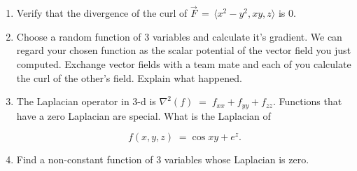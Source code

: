 \documentclass{amsart}
\begin{document}
\begin{enumerate}
\vfill

\newpage 

\item Verify that the divergence of the curl of $\vec{F} \, = \, \langle x^2-y^2, xy, z  \rangle$ is 0.

\vfill

\item Choose a random function of 3 variables and calculate it's gradient.  We can regard your chosen function as the scalar potential of the vector field you just computed.  Exchange vector fields with a team mate and each of you calculate the curl of the other's field.   Explain what happened.

\vfill

\newpage

\item The Laplacian operator in 3-d is $ \nabla^2(f) \; = \; f_{xx} + f_{yy} + f_{zz}$.  Functions that have a zero Laplacian are special.  What is the Laplacian of 

\[ f(x,y,z) \; = \cos{xy} + e^z. \]

\vfill

\item Find a non-constant function of 3 variables whose Laplacian is zero. 

\vfill

\end{enumerate}
\end{document}
